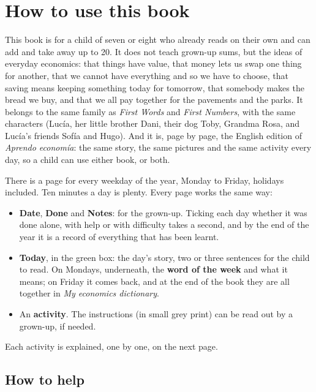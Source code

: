 \section*{How to use this book}

This book is for a child of seven or eight who already reads on their
own and can add and take away up to 20. It does not teach grown-up
sums, but the ideas of everyday economics: that things have value, that
money lets us swap one thing for another, that we cannot have
everything and so we have to choose, that saving means keeping
something today for tomorrow, that somebody makes the bread we buy, and
that we all pay together for the pavements and the parks. It belongs to
the same family as \emph{First Words} and \emph{First Numbers}, with the
same characters (Lucía, her little brother Dani, their dog Toby,
Grandma Rosa, and Lucía's friends Sofía and Hugo). And it is, page by
page, the English edition of \emph{Aprendo economía}: the same story,
the same pictures and the same activity every day, so a child can use
either book, or both.

There is a page for every weekday of the year, Monday to Friday,
holidays included. Ten minutes a day is plenty. Every page works the
same way:

\begin{itemize}[leftmargin=6mm]
\item \textbf{Date}, \textbf{Done} and \textbf{Notes}: for the grown-up.
  Ticking each day whether it was done alone, with help or with
  difficulty takes a second, and by the end of the year it is a record
  of everything that has been learnt.
\item \textbf{Today}, in the green box: the day's story, two or three
  sentences for the child to read. On Mondays, underneath, the
  \textbf{word of the week} and what it means; on Friday it comes back,
  and at the end of the book they are all together in \emph{My
  economics dictionary}.
\item An \textbf{activity}. The instructions (in small grey print) can
  be read out by a grown-up, if needed.
\end{itemize}

Each activity is explained, one by one, on the next page.

\subsection*{How to help}


